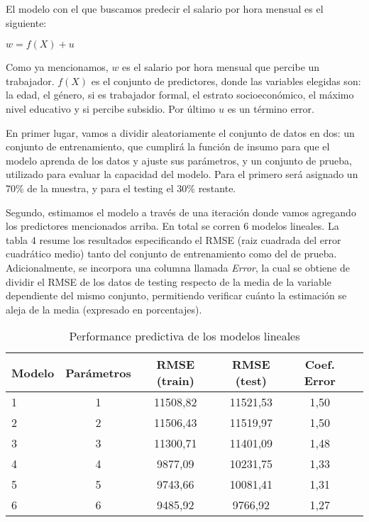 \documentclass[11pt,oneside]{article}
\begin{document}
	El modelo con el que buscamos predecir el salario por hora mensual es el siguiente:
	
	\begin{center}
		$w = f(X) + u$
	\end{center}
	
	Como ya mencionamos, $w$ es el salario por hora mensual que percibe un trabajador. $f(X)$ es el conjunto de predictores, donde las variables elegidas son: la edad, el género, si es trabajador formal, el estrato socioeconómico, el máximo nivel educativo y si percibe subsidio. Por último $u$ es un término error.
	
	En primer lugar, vamos a dividir aleatoriamente el conjunto de datos en dos: un conjunto de entrenamiento, que cumplirá la función de insumo para que el modelo aprenda de los datos y ajuste sus parámetros, y un conjunto de prueba, utilizado para evaluar la capacidad del modelo. Para el primero será asignado un 70\% de la muestra, y para el testing el 30\% restante.
	
	Segundo, estimamos el modelo a través de una iteración donde vamos agregando los predictores mencionados arriba. En total se corren 6 modelos lineales. La tabla 4 resume los resultados especificando el RMSE (raiz cuadrada del error cuadrático medio) tanto del conjunto de entrenamiento como del de prueba. Adicionalmente, se incorpora una columna llamada \textit{Error}, la cual se obtiene de dividir el RMSE de los datos de testing respecto de la media de la variable dependiente del mismo conjunto, permitiendo verificar cuánto la estimación se aleja de la media (expresado en porcentajes). 
	
	\begin{table}[H]
		\centering
		\begin{tabular}{lccccc}
			\hline
			\textbf{Modelo} & \textbf{Parámetros} & \textbf{RMSE (train)} & \textbf{RMSE (test)} & \textbf{Coef. Error} \\ \hline
			1 & 1 & 11508,82 & 11521,53 & 1,50 \\ 
			2 & 2 & 11506,43 & 11519,97 & 1,50 \\ 
			3 & 3 & 11300,71 & 11401,09 & 1,48 \\ 
			4 & 4 & 9877,09  & 10231,75 & 1,33 \\ 
			5 & 5 & 9743,66  & 10081,41 & 1,31 \\ 
			6 & 6 & 9485,92  & 9766,92  & 1,27 \\ \hline
		\end{tabular}
		\caption{Performance predictiva de los modelos lineales}
		\label{tab:modelos_rmse}
	\end{table}
	
\end{document}
